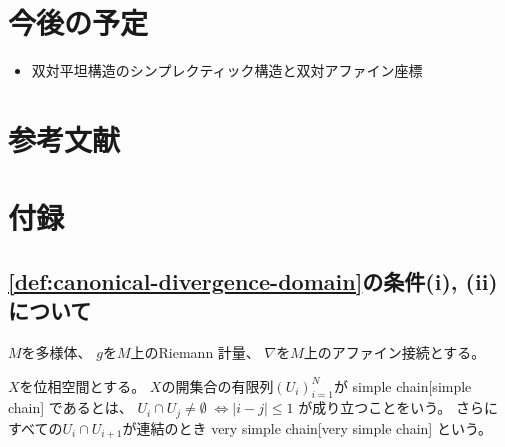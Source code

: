 \documentclass[report]{jlreq}
\begin{document}
\section*{今後の予定}

\begin{itemize}
    \item 双対平坦構造のシンプレクティック構造と双対アファイン座標
\end{itemize}

%
\section*{参考文献}


\nocite{amari_information_2016}
\nocite{_bayes_2020}

{
    \renewcommand{\bibsection}{}
    
    
}

%
\newpage
\appendix
\renewcommand\thesection{\Alph{section}}
\setcounter{section}{0}
\section{付録}

\subsection{\cref{def:canonical-divergence-domain}の条件(i), (ii)について}

$M$を多様体、
$g$を$M$上のRiemann 計量、
$\nabla$を$M$上のアファイン接続とする。

\begin{definition}
    $X$を位相空間とする。
    $X$の開集合の有限列$(U_i)_{i = 1}^N$が
        {simple chain}[simple chain]
    であるとは、
    $U_i \cap U_j \neq \emptyset \;
        \iff |i - j| \le 1$
    が成り立つことをいう。
    さらにすべての$U_i \cap U_{i + 1}$が連結のとき
        {very simple chain}[very simple chain]
    という。
\end{definition}
\end{document}
